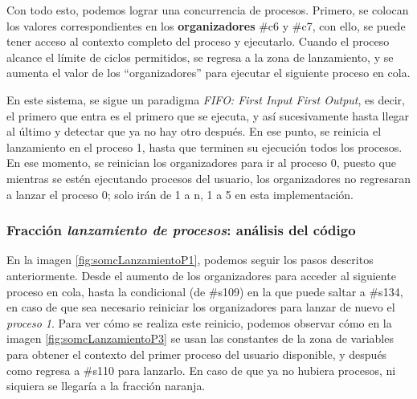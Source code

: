 \documentclass[letterpaper,12pt,oneside]{book}
\begin{document}
		
		Con todo esto, podemos lograr una concurrencia de procesos. Primero, se colocan los valores 
		correspondientes en los
		\textbf{organizadores} \#c6 y \#c7, con ello, se puede tener acceso al contexto completo del proceso y ejecutarlo. Cuando
		el proceso alcance el límite de ciclos permitidos, se regresa 
		a la zona de lanzamiento,
		y se aumenta el valor de los ``organizadores'' para ejecutar el siguiente proceso en cola. 
		
		En
		este sistema, se sigue un paradigma \textit{FIFO: First Input First 
		Output}, 
		es decir, el primero que entra es el primero que se ejecuta, 
		y así sucesivamente hasta llegar al último y detectar que ya no hay otro después. En 
		ese punto, se reinicia el lanzamiento en el proceso 1, hasta que terminen su ejecución todos los procesos.
		En ese momento, se reinician los organizadores para ir al proceso 0, puesto que mientras se estén ejecutando procesos del usuario, los organizadores
		no regresaran a lanzar el proceso 0; solo irán de 1 a n, 1 a 5 en esta implementación.

  		\subsubsection{Fracción \textit{lanzamiento de procesos}: análisis del código }
		
		En la imagen \ref{fig:somcLanzamientoP1}, podemos seguir  los pasos descritos anteriormente.
        Desde el aumento de los organizadores para acceder al siguiente proceso en cola,
        hasta la condicional (de \#s109) en la que puede saltar a \#s134,  en caso de que sea necesario
		reiniciar los organizadores para lanzar de nuevo el \textit{proceso 1}. 
		Para ver cómo se realiza este reinicio, podemos observar cómo en la imagen
		\ref{fig:somcLanzamientoP3} se usan las constantes de la zona de variables para obtener el contexto del primer proceso del usuario disponible, y 
		después como
        regresa a \#s110 para lanzarlo. En caso de que ya no hubiera procesos, ni siquiera se llegaría a la fracción naranja.
		
		
\end{document}
